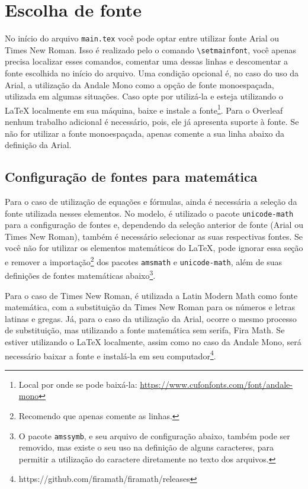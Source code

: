 \section{Escolha de fonte}
No início do arquivo \texttt{main.tex} você pode optar entre utilizar fonte Arial ou Times New Roman. Isso é realizado pelo o comando \verb|\setmainfont|, você apenas precisa localizar esses comandos, comentar uma dessas linhas e descomentar a fonte escolhida no início do arquivo. Uma condição opcional é, no caso do uso da Arial, a utilização da Andale Mono como a opção de fonte monoespaçada, utilizada em algumas situações. Caso opte por utilizá-la e esteja utilizando o \LaTeX{} localmente em sua máquina, baixe e instale a fonte\footnote{Local por onde se pode baixá-la: \url{https://www.cufonfonts.com/font/andale-mono}}. Para o Overleaf nenhum trabalho adicional é necessário, pois, ele já apresenta suporte à fonte. Se não for utilizar a fonte monoespaçada, apenas comente a sua linha abaixo da definição da Arial.

\subsection{Configuração de fontes para matemática}
Para o caso de utilização de equações e fórmulas, ainda é necessária a seleção da fonte utilizada nesses elementos. No modelo, é utilizado o pacote \texttt{unicode-math} para a configuração de fontes e, dependendo da seleção anterior de fonte (Arial ou Times New Roman), também é necessário selecionar as suas respectivas fontes. Se você não for utilizar os elementos matemáticos do \LaTeX{}, pode ignorar essa seção e remover a importação\footnote{Recomendo que apenas comente as linhas.} dos pacotes \texttt{amsmath} e \texttt{unicode-math}, além de suas definições de fontes matemáticas abaixo\footnote{O pacote \texttt{amssymb}, e seu arquivo de configuração abaixo, também pode ser removido, mas existe o seu uso na definição de alguns caracteres, para permitir a utilização do caractere diretamente no texto dos arquivos.}.

Para o caso de Times New Roman, é utilizada a Latin Modern Math como fonte matemática, com a substituição da Times New Roman para os números e letras latinas e gregas. Já, para o caso da utilização da Arial, ocorre o mesmo processo de substituição, mas utilizando a fonte matemática sem serifa, Fira Math. Se estiver utilizando o \LaTeX{} localmente, assim como no caso da Andale Mono, será necessário baixar a fonte e instalá-la em seu computador\footnote{https://github.com/firamath/firamath/releases}.

